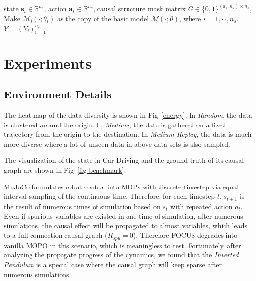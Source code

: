 \documentclass{article}
\theoremstyle{plain}
\theoremstyle{definition}
\theoremstyle{remark}
\begin{document}
\begin{algorithm}[ht!]
  \caption{Causal Structure Network $\mathcal{M}_{Causal}(\cdot)$}
  \label{alg-network}
\begin{algorithmic}
   state $\textbf{s}_t\in\mathbb{R}^{n_s}$, action $\textbf{a}_t\in\mathbb{R}^{n_a}$, 
  \STATE causal structure mask matrix $G\in\{0,1\}^{(n_s,n_a)\times n_s}$,
  \STATE Make $\mathcal{M}_{i}(\cdot;\theta_i)$ as the copy of the basic model $\mathcal{M}(\cdot;\theta)$, where $i=1,\cdots, n_s$.
  \ENDFOR
   $Y=(Y_i)_{i=1}^{n_s}$.
\end{algorithmic}
\end{algorithm}
\section{Experiments}
\subsection{Environment Details}
\label{app:exp-1}

The heat map of the data diversity is shown in Fig~\ref{energy}. 
In \textit{Random}, the data is clustered around the origin.
In \textit{Medium}, the data is gathered on a fixed trajectory from the origin to the destination.
In \textit{Medium-Replay}, the data is much more diverse where a lot of unseen data in above data sets is also sampled. 

The visualization of the state in Car Driving and the ground truth of its causal graph are shown in Fig~\ref{fig-benchmark}.


MuJoCo formulates robot control into MDPs with discrete timestep via equal interval sampling of the continuous-time. 
Therefore, for each timestep $t$, $s_{t+1}$ is the result of numerous times of simulation based on $s_t$ with repeated action $a_t$. 
Even if spurious variables are existed in one time of simulation, after numerous simulations, the causal effect will be propagated to almost variables, which leads to a full-connection causal graph ($R_{spu}=0$).
Therefore FOCUS degrades into vanilla MOPO in this scenario, which is meaningless to test. 
Fortunately, after analyzing the propagate progress of the dynamics, we found that the \textit{Inverted Pendulum} is a special case where the causal graph will keep sparse after numerous simulations.
\end{document}
